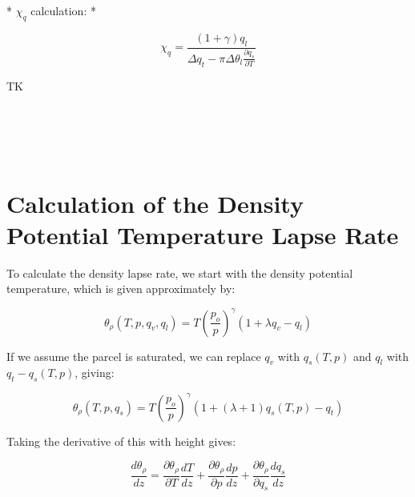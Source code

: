 \documentclass[acp]{copernicus}
\begin{document}

* $\chi_q$ calculation: *

\begin{equation}
\chi_q = \frac{(1 + \gamma) q_l}{\Delta q_t - \pi \Delta \theta_l \frac{\partial q_s}{\partial T}}
\end{equation}




\conclusions

TK


\appendix
\section{\\ \\ \hspace*{-7mm} Calculation of the Density Potential Temperature Lapse Rate}    %

To calculate the density lapse rate, we start with the density potential 
temperature, which is given approximately by:

\begin{equation}
\label{eq:density_potential_temperature}
  \theta_\rho(T, p, q_v, q_l) = T \left(\frac{p_o}{p}\right)^\gamma (1 + \lambda q_v - q_l)
\end{equation}

If we assume the parcel is saturated, we can replace $q_v$ with $q_s(T, p)$ and 
$q_l$ with $q_t - q_s(T, p)$, giving:

\begin{equation}
\label{eq:density_potential_temperature_qs}
  \theta_\rho(T, p, q_s) = T \left(\frac{p_o}{p}\right)^\gamma (1 + (\lambda + 1) q_s(T, p) - q_t)
\end{equation}


Taking the derivative of this with height gives:

\begin{equation}
\label{eq:density_potential_temperature_gradient_1}
  \frac{d \theta_\rho}{dz} = \frac{\partial \theta_\rho}{\partial T}\frac{dT}{dz}
                          + \frac{\partial \theta_\rho}{\partial p}\frac{dp}{dz}
                          + \frac{\partial \theta_\rho}{\partial q_s}\frac{dq_s}{dz}
\end{equation}
\end{document}
